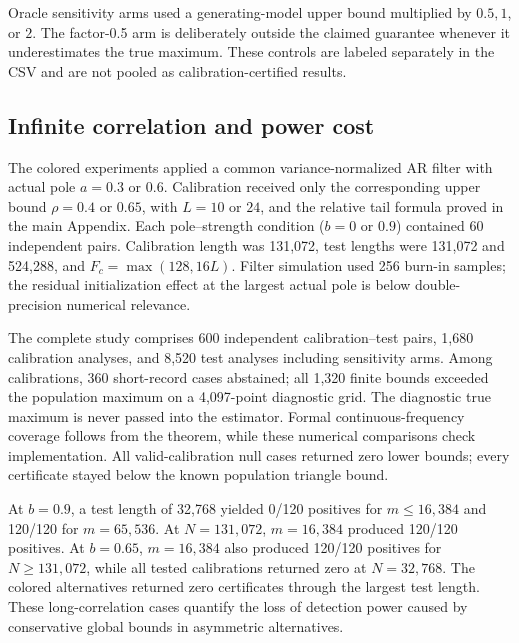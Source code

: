 Oracle sensitivity arms used a generating-model upper bound multiplied by $0.5,1$, or $2$. The factor-0.5 arm is deliberately outside the claimed guarantee whenever it underestimates the true maximum. These controls are labeled separately in the CSV and are not pooled as calibration-certified results.

\subsection{Infinite correlation and power cost}
The colored experiments applied a common variance-normalized AR filter with actual pole $a=0.3$ or $0.6$. Calibration received only the corresponding upper bound $\rho=0.4$ or $0.65$, with $L=10$ or $24$, and the relative tail formula proved in the main Appendix. Each pole--strength condition ($b=0$ or $0.9$) contained 60 independent pairs. Calibration length was 131,072, test lengths were 131,072 and 524,288, and $F_c=\max(128,16L)$. Filter simulation used 256 burn-in samples; the residual initialization effect at the largest actual pole is below double-precision numerical relevance.

The complete study comprises 600 independent calibration--test pairs, 1,680 calibration analyses, and 8,520 test analyses including sensitivity arms. Among calibrations, 360 short-record cases abstained; all 1,320 finite bounds exceeded the population maximum on a 4,097-point diagnostic grid. The diagnostic true maximum is never passed into the estimator. Formal continuous-frequency coverage follows from the theorem, while these numerical comparisons check implementation. All valid-calibration null cases returned zero lower bounds; every certificate stayed below the known population triangle bound.

At $b=0.9$, a test length of 32,768 yielded 0/120 positives for $m\le16,384$ and 120/120 for $m=65,536$. At $N=131,072$, $m=16,384$ produced 120/120 positives. At $b=0.65$, $m=16,384$ also produced 120/120 positives for $N\ge131,072$, while all tested calibrations returned zero at $N=32,768$. The colored alternatives returned zero certificates through the largest test length. These long-correlation cases quantify the loss of detection power caused by conservative global bounds in asymmetric alternatives.

